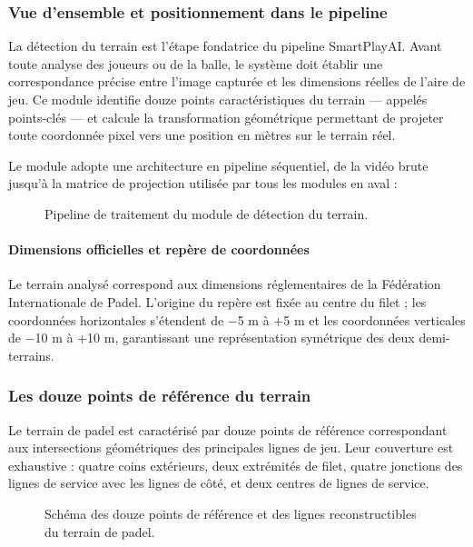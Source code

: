 \subsubsection{Vue d'ensemble et positionnement dans le pipeline}

La détection du terrain est l'étape fondatrice du pipeline SmartPlayAI. Avant toute analyse des joueurs ou de la balle, le système doit établir une correspondance précise entre l'image capturée et les dimensions réelles de l'aire de jeu. Ce module identifie douze points caractéristiques du terrain — appelés points-clés — et calcule la transformation géométrique permettant de projeter toute coordonnée pixel vers une position en mètres sur le terrain réel.

Le module adopte une architecture en pipeline séquentiel, de la vidéo brute jusqu'à la matrice de projection utilisée par tous les modules en aval :

\begin{figure}[H]
    \centering
    \caption{Pipeline de traitement du module de détection du terrain.}
    \label{fig:pipeline_terrain}
\end{figure}

\paragraph{Dimensions officielles et repère de coordonnées}

Le terrain analysé correspond aux dimensions réglementaires de la Fédération Internationale de Padel. L'origine du repère est fixée au centre du filet ; les coordonnées horizontales s'étendent de −5 m à +5 m et les coordonnées verticales de −10 m à +10 m, garantissant une représentation symétrique des deux demi-terrains.

 
\subsubsection{Les douze points de référence du terrain}

Le terrain de padel est caractérisé par douze points de référence correspondant aux intersections géométriques des principales lignes de jeu. Leur couverture est exhaustive : quatre coins extérieurs, deux extrémités de filet, quatre jonctions des lignes de service avec les lignes de côté, et deux centres de lignes de service.

\begin{figure}[H]
    \centering
    \caption{Schéma des douze points de référence et des lignes reconstructibles du terrain de padel.}
    \label{fig:keypoints_terrain}
\end{figure}

